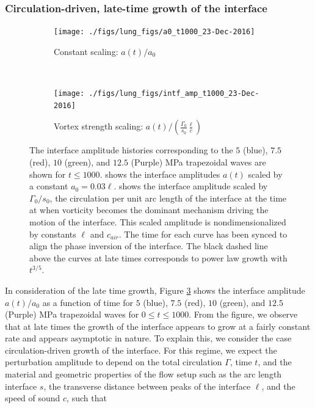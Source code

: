 \documentclass{jfm}%
\begin{document}
\subsubsection{Circulation-driven, late-time growth of the interface}
\begin{figure}
  \centering
  \begin{subfigure}[t]{0.45\textwidth}
    \centering
    \texttt{[image: ./figs/lung\_figs/a0\_t1000\_23-Dec-2016]}
    \caption{\label{fig:trapz_interface_t1000} Constant scaling: $a(t)/a_0$}
  \end{subfigure}
  ~
  \begin{subfigure}[t]{0.45\textwidth}
    \centering
    \texttt{[image: ./figs/lung\_figs/intf\_amp\_t1000\_23-Dec-2016]}
    \caption{\label{fig:trapz_interface_t1000_scaled} Vortex strength scaling: $a(t)/\left(\frac{\Gamma_0}{s_0}\frac{\ell}{c}\right)$}
  \end{subfigure}
  \caption[The interface amplitude at long time]{The interface
    amplitude histories corresponding to the $5$ (blue), $7.5$ (red),
    $10$ (green), and $12.5$ (Purple) MPa trapezoidal waves are shown
    for $t\leq 1000$.  shows the
    interface amplitudes $a(t)$ scaled by a constant
    $a_0=0.03\ell$. \protect{}
    shows the interface amplitude scaled by $\Gamma_0/s_0$, the
    circulation per unit arc length of the interface at the time at
    when vorticity becomes the dominant mechanism driving the motion
    of the interface. This scaled amplitude is nondimensionalized by
    constants $\ell$ and $c_{air}$. The time for each curve has been
    synced to align the phase inversion of the interface. The black
    dashed line above the curves at late times corresponds to power
    law growth with $t^{3/5}$.}
  \label{fig:trapz_interface_loglog}
\end{figure}

In consideration of the late time growth, Figure
\ref{fig:trapz_interface_loglog} shows the interface amplitude
$a(t)/a_0$ as a function of time for $5$ (blue), $7.5$ (red), $10$
(green), and $12.5$ (Purple) MPa trapezoidal waves for
$0 \leq t\leq 1000$. From the figure, we observe that at late times
the growth of the interface appears to grow at a fairly constant rate
and appears asymptotic in nature. To explain this, we consider the
case circulation-driven growth of the interface. For this regime, we
expect the perturbation amplitude to depend on the total circulation
$\Gamma$, time $t$, and the material and geometric properties of the
flow setup such as the arc length interface $s$, the transverse
distance between peaks of the interface $\ell$, and the speed of sound
$c$, such that
\end{document}
